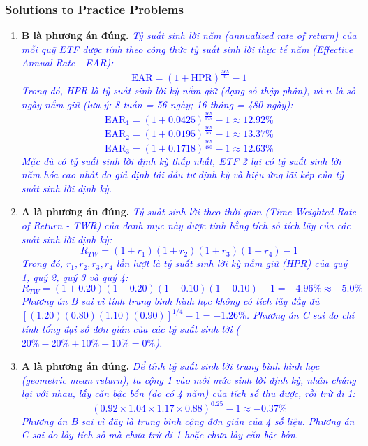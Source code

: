 \subsubsection{Solutions to Practice Problems}
\label{subsec:app_Solutions_M1}

\begin{enumerate}
	\item \textbf{B là phương án đúng.} \textcolor{blue}{\textit{Tỷ suất sinh lời năm (annualized rate of return) của mỗi quỹ ETF được tính theo công thức tỷ suất sinh lời thực tế năm (Effective Annual Rate - EAR):
	      \[
	      \text{EAR} = (1 + \text{HPR})^{\frac{365}{n}} - 1
	      \]
	      Trong đó, HPR là tỷ suất sinh lời kỳ nắm giữ (dạng số thập phân), và $n$ là số ngày nắm giữ (lưu ý: 8 tuần = 56 ngày; 16 tháng = 480 ngày):
	      \[
	      \text{EAR}_1 = (1 + 0.0425)^{\frac{365}{125}} - 1 \approx 12.92\%
	      \]
	      \[
	      \text{EAR}_2 = (1 + 0.0195)^{\frac{365}{56}} - 1 \approx 13.37\%
	      \]
	      \[
	      \text{EAR}_3 = (1 + 0.1718)^{\frac{365}{480}} - 1 \approx 12.63\%
	      \]
	      Mặc dù có tỷ suất sinh lời định kỳ thấp nhất, ETF 2 lại có tỷ suất sinh lời năm hóa cao nhất do giả định tái đầu tư định kỳ và hiệu ứng lãi kép của tỷ suất sinh lời định kỳ.}}

	\item \textbf{A là phương án đúng.} \textcolor{blue}{\textit{Tỷ suất sinh lời theo thời gian (Time-Weighted Rate of Return - TWR) của danh mục này được tính bằng tích số tích lũy của các suất sinh lời định kỳ:
	      \[
	      R_{TW} = (1 + r_1)(1 + r_2)(1 + r_3)(1 + r_4) - 1
	      \]
	      Trong đó, $r_1, r_2, r_3, r_4$ lần lượt là tỷ suất sinh lời kỳ nắm giữ (HPR) của quý 1, quý 2, quý 3 và quý 4:
	      \[
	      R_{TW} = (1 + 0.20)(1 - 0.20)(1 + 0.10)(1 - 0.10) - 1 = -4.96\% \approx -5.0\%
	      \]
	      Phương án B sai vì tính trung bình hình học không có tích lũy đầy đủ $[(1.20)(0.80)(1.10)(0.90)]^{1/4} - 1 = -1.26\%$. Phương án C sai do chỉ tính tổng đại số đơn giản của các tỷ suất sinh lời ($20\% - 20\% + 10\% - 10\% = 0\%$).}}

	\item \textbf{A là phương án đúng.} \textcolor{blue}{\textit{Để tính tỷ suất sinh lời trung bình hình học (geometric mean return), ta cộng 1 vào mỗi mức sinh lời định kỳ, nhân chúng lại với nhau, lấy căn bậc bốn (do có 4 năm) của tích số thu được, rồi trừ đi 1:
	      \[
	      (0.92 \times 1.04 \times 1.17 \times 0.88)^{0.25} - 1 \approx -0.37\%
	      \]
	      Phương án B sai vì đây là trung bình cộng đơn giản của 4 số liệu. Phương án C sai do lấy tích số mà chưa trừ đi 1 hoặc chưa lấy căn bậc bốn.}}
\end{enumerate}

